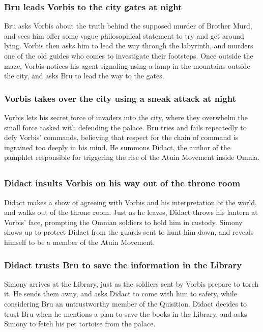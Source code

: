 \subsubsection{\Gls{Bru} leads \Gls{Vorbis} to the city gates at night}
\Gls{Bru} asks \Gls{Vorbis} about the truth behind the supposed murder of Brother \Gls{Murd}, and
sees him offer some vague philosophical statement to try and get around lying. \Gls{Vorbis} then
asks him to lead the way through the labyrinth, and murders one of the old guides who comes to
investigate their footsteps. Once outside the maze, \Gls{Vorbis} notices his agent signaling using
a lamp in the mountains outside the city, and asks \Gls{Bru} to lead the way to the gates.

\subsubsection{\Gls{Vorbis} takes over the city using a sneak attack at night}
\Gls{Vorbis} lets his secret force of invaders into the city, where they overwhelm the small force
tasked with defending the palace. \Gls{Bru} tries and fails repeatedly to defy \Gls{Vorbis}'
commands, believing that respect for the chain of command is ingrained too deeply in his mind.
He summons \Gls{Didact}, the author of the pamphlet responsible for triggering the rise of the
\Gls{Atuin} Movement inside Omnia.

\subsection{}
\subsubsection{\Gls{Didact} insults \Gls{Vorbis} on his way out of the throne room}
\Gls{Didact} makes a show of agreeing with \Gls{Vorbis} and his interpretation of the world, and
walks out of the throne room. Just as he leaves, \Gls{Didact} throws his lantern at \Gls{Vorbis}'
face, prompting the Omnian soldiers to hold him in custody. \Gls{Simony} shows up to protect
\Gls{Didact} from the guards sent to hunt him down, and reveals himself to be a member of the
\Gls{Atuin} Movement.

\subsubsection{\Gls{Didact} trusts \Gls{Bru} to save the information in the Library}
\Gls{Simony} arrives at the Library, just as the soldiers sent by \Gls{Vorbis} prepare to torch it.
He sends them away, and asks \Gls{Didact} to come with him to safety, while considering \Gls{Bru}
an untrustworthy member of the Quisition. \Gls{Didact} decides to trust \Gls{Bru} when he mentions
a plan to save the books in the Library, and asks \Gls{Simony} to fetch his pet tortoise from the
palace.

